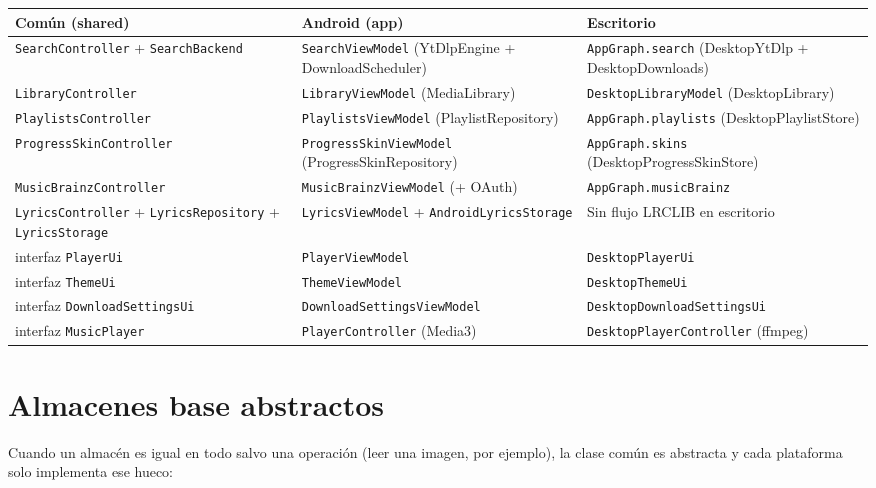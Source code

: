 \documentclass[11pt,a4paper,oneside]{report}
\newcommand{\cod}[1]{\texttt{\small #1}}
\begin{document}
\begin{longtable}{>{\raggedright\arraybackslash}p{4.2cm} >{\raggedright\arraybackslash}p{5.6cm} >{\raggedright\arraybackslash}p{5.6cm}}
\toprule
\textbf{Común (shared)} & \textbf{Android (app)} & \textbf{Escritorio} \\ \midrule \endhead
\bottomrule \endfoot
\cod{SearchController} + \cod{SearchBackend} & \cod{SearchViewModel} (YtDlpEngine + DownloadScheduler) & \cod{AppGraph.search} (DesktopYtDlp + DesktopDownloads) \\
\cod{LibraryController} & \cod{LibraryViewModel} (MediaLibrary) & \cod{DesktopLibraryModel} (DesktopLibrary) \\
\cod{PlaylistsController} & \cod{PlaylistsViewModel} (PlaylistRepository) & \cod{AppGraph.playlists} (DesktopPlaylistStore) \\
\cod{ProgressSkinController} & \cod{ProgressSkinViewModel} (ProgressSkinRepository) & \cod{AppGraph.skins} (DesktopProgressSkinStore) \\
\cod{MusicBrainzController} & \cod{MusicBrainzViewModel} (+ OAuth) & \cod{AppGraph.musicBrainz} \\
\cod{LyricsController} + \cod{LyricsRepository} + \cod{LyricsStorage} & \cod{LyricsViewModel} + \cod{AndroidLyricsStorage} & Sin flujo LRCLIB en escritorio \\
interfaz \cod{PlayerUi} & \cod{PlayerViewModel} & \cod{DesktopPlayerUi} \\
interfaz \cod{ThemeUi} & \cod{ThemeViewModel} & \cod{DesktopThemeUi} \\
interfaz \cod{DownloadSettingsUi} & \cod{DownloadSettingsViewModel} & \cod{DesktopDownloadSettingsUi} \\
interfaz \cod{MusicPlayer} & \cod{PlayerController} (Media3) & \cod{DesktopPlayerController} (ffmpeg) \\
\end{longtable}

\section{Almacenes base abstractos}

Cuando un almacén es igual en todo salvo una operación (leer una imagen, por ejemplo), la clase
común es abstracta y cada plataforma solo implementa ese hueco:
\end{document}
